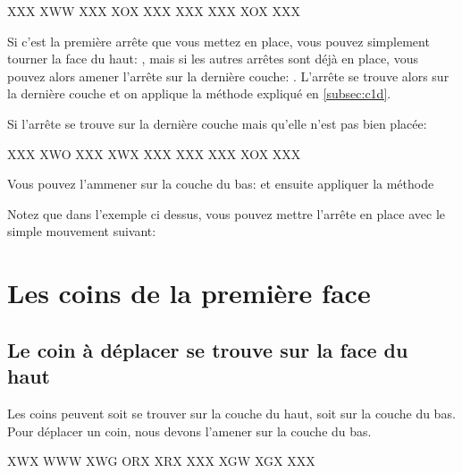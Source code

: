 \documentclass[10pt,paper=a5,pagesize]{scrbook}
\begin{document}

\begin{center}
	\RubikFaceUp%
	{X}{X}{X}%
	{X}{W}{W}%
	{X}{X}{X}
	\RubikFaceRight%
	{X}{O}{X}%
	{X}{X}{X}%
	{X}{X}{X}
	\RubikFaceFront%
	{X}{X}{X}%
	{X}{O}{X}%
	{X}{X}{X}
\end{center}

Si c'est la première arrête que vous mettez en place, vous pouvez simplement tourner la face du haut: , mais si les autres arrêtes sont déjà en place, vous pouvez alors amener l'arrête sur la dernière couche: . L'arrête se trouve alors sur la dernière couche et on applique la méthode expliqué en \ref{subsec:c1d}.

Si l'arrête se trouve sur la dernière couche mais qu'elle n'est pas bien placée:

\begin{center}
	\RubikFaceUp%
	{X}{X}{X}%
	{X}{W}{O}%
	{X}{X}{X}
	\RubikFaceRight%
	{X}{W}{X}%
	{X}{X}{X}%
	{X}{X}{X}
	\RubikFaceFront%
	{X}{X}{X}%
	{X}{O}{X}%
	{X}{X}{X}
\end{center}

Vous pouvez l'ammener sur la couche du bas:  et ensuite appliquer la méthode

Notez que dans l'exemple ci dessus, vous pouvez mettre l'arrête en place avec le simple mouvement suivant: 

\section{Les coins de la première face}

\subsection{Le coin à déplacer se trouve sur la face du haut}
Les coins peuvent soit se trouver sur la couche du haut, soit sur la couche du bas.
Pour déplacer un coin, nous devons l'amener sur la couche du bas.

\begin{center}
	\RubikFaceUp%
	{X}{W}{X}%
	{W}{W}{W}%
	{X}{W}{G}
	\RubikFaceRight%
	{O}{R}{X}%
	{X}{R}{X}%
	{X}{X}{X}
	\RubikFaceFront%
	{X}{G}{W}%
	{X}{G}{X}%
	{X}{X}{X}
\end{center}
\end{document}
